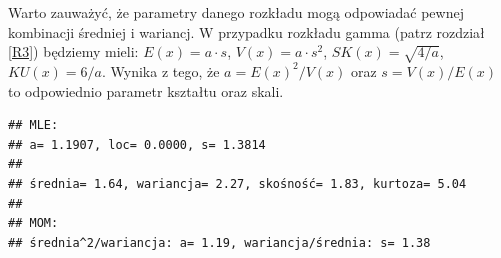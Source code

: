 \documentclass[polish,]{book}
\newenvironment{Shaded}{\begin{snugshade}}{\end{snugshade}}
\newcommand{\BuiltInTok}[1]{#1}
\newcommand{\CharTok}[1]{\textcolor[rgb]{0.31,0.60,0.02}{#1}}
\newcommand{\DecValTok}[1]{\textcolor[rgb]{0.00,0.00,0.81}{#1}}
\newcommand{\FloatTok}[1]{\textcolor[rgb]{0.00,0.00,0.81}{#1}}
\newcommand{\ImportTok}[1]{#1}
\newcommand{\NormalTok}[1]{#1}
\newcommand{\OperatorTok}[1]{\textcolor[rgb]{0.81,0.36,0.00}{\textbf{#1}}}
\newcommand{\SpecialCharTok}[1]{\textcolor[rgb]{0.00,0.00,0.00}{#1}}
\newcommand{\StringTok}[1]{\textcolor[rgb]{0.31,0.60,0.02}{#1}}
\begin{document}
Warto zauważyć, że parametry danego rozkładu mogą odpowiadać pewnej kombinacji średniej i wariancj. W przypadku rozkładu gamma (patrz rozdział \ref{R3}) będziemy mieli: \(E(x)=a\cdot s\), \(V(x)=a\cdot s^2\), \(SK(x)=\sqrt{4/a}\), \(KU(x)=6/a\). Wynika z tego, że \(a=E(x)^2/V(x)\) oraz \(s=V(x)/E(x)\) to odpowiednio parametr kształtu oraz skali.

\begin{Shaded}
\end{Shaded}

\begin{verbatim}
## MLE:
## a= 1.1907, loc= 0.0000, s= 1.3814
## 
## średnia= 1.64, wariancja= 2.27, skośność= 1.83, kurtoza= 5.04
## 
## MOM:
## średnia^2/wariancja: a= 1.19, wariancja/średnia: s= 1.38
\end{verbatim}
\end{document}
